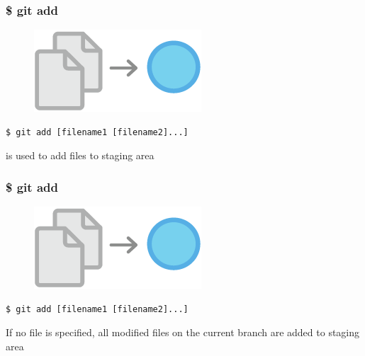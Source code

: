 \documentclass{beamer}
\begin{document}
\begin{frame}[fragile]
    \frametitle{\$ git add}
    \begin{figure}[h!]
        \begin{center}
            \includegraphics[scale=0.7]{add.png}
        \end{center}
    \end{figure}
    \begin{verbatim}
$ git add [filename1 [filename2]...]
    \end{verbatim}
    is used to add files to staging area
\end{frame}

\begin{frame}[fragile]
    \frametitle{\$ git add}
    \begin{figure}[h!]
        \begin{center}
            \includegraphics[scale=0.7]{add.png}
        \end{center}
    \end{figure}
    \begin{verbatim}
$ git add [filename1 [filename2]...]
    \end{verbatim}
    If no file is specified, all modified files on the current branch are added to staging area
\end{frame}
\end{document}
